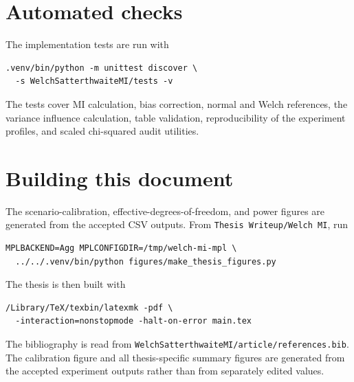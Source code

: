 \section{Automated checks}

The implementation tests are run with
\begin{verbatim}
.venv/bin/python -m unittest discover \
  -s WelchSatterthwaiteMI/tests -v
\end{verbatim}
The tests cover MI calculation, bias correction, normal and Welch references,
the variance influence calculation, table validation, reproducibility of the
experiment profiles, and scaled chi-squared audit utilities.

\section{Building this document}

The scenario-calibration, effective-degrees-of-freedom, and power figures are
generated from the accepted CSV outputs. From
\texttt{Thesis Writeup/Welch MI}, run
\begin{verbatim}
MPLBACKEND=Agg MPLCONFIGDIR=/tmp/welch-mi-mpl \
  ../../.venv/bin/python figures/make_thesis_figures.py
\end{verbatim}
The thesis is then built with
\begin{verbatim}
/Library/TeX/texbin/latexmk -pdf \
  -interaction=nonstopmode -halt-on-error main.tex
\end{verbatim}
The bibliography is read from
\texttt{WelchSatterthwaiteMI/article/references.bib}. The calibration figure
and all thesis-specific summary figures are generated from the accepted
experiment outputs rather than from separately edited values.
